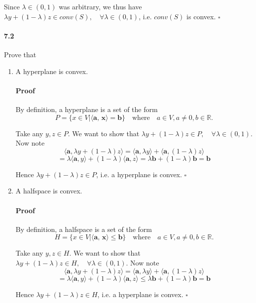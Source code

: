 \documentclass[letterpaper,12pt]{article}
\theoremstyle{definition}
\begin{document}
Since $\lambda \in (0,1)$ was arbitrary, we thus have $\lambda y + (1 - \lambda) z \in conv(S), \quad \forall \lambda \in (0,1)$, i.e. $conv(S)$ is convex. $\square$

\paragraph{7.2} Prove that 
\begin{enumerate}[label = (\roman*)]

\item A hyperplane is convex.

\paragraph{Proof} By definition, a hyperplane is a set of the form $$ P = \{x \in V | \langle \textbf{a, x} \rangle = \textbf{b} \} \quad \text{where} \quad a \in V, a \neq 0, b \in \mathbb{R}.$$

Take any $y, z \in P$. We want to show that $\lambda y + (1 - \lambda) z \in P, \quad \forall \lambda \in (0,1)$.
Now note $$\langle \textbf{a}, \lambda y + (1 - \lambda) z \rangle 
= \langle \textbf{a}, \lambda y \rangle + \langle \textbf{a},(1 - \lambda) z \rangle $$
$$= \lambda \langle \textbf{a}, y \rangle + (1 - \lambda) \langle \textbf{a}, z \rangle 
= \lambda \textbf{b} + (1 - \lambda) \textbf{b}
= \textbf{b}$$

Hence $\lambda y + (1 - \lambda) z \in P$, i.e. a hyperplane is convex. $\square$


\item A halfspace is convex.

\paragraph{Proof} By definition, a halfspace is a set of the form $$ H = \{x \in V | \langle \textbf{a, x} \rangle \le \textbf{b} \} \quad \text{where} \quad a \in V, a \neq 0, b \in \mathbb{R}.$$

Take any $y, z \in H$. We want to show that $\lambda y + (1 - \lambda) z \in H, \quad \forall \lambda \in (0,1)$.
Now note $$\langle \textbf{a}, \lambda y + (1 - \lambda) z \rangle 
= \langle \textbf{a}, \lambda y \rangle + \langle \textbf{a},(1 - \lambda) z \rangle $$
$$= \lambda \langle \textbf{a}, y \rangle + (1 - \lambda) \langle \textbf{a}, z \rangle 
\le \lambda \textbf{b} + (1 - \lambda) \textbf{b}
= \textbf{b}$$

Hence $\lambda y + (1 - \lambda) z \in H$, i.e. a hyperplane is convex. $\square$

\end{enumerate}
\end{document}
